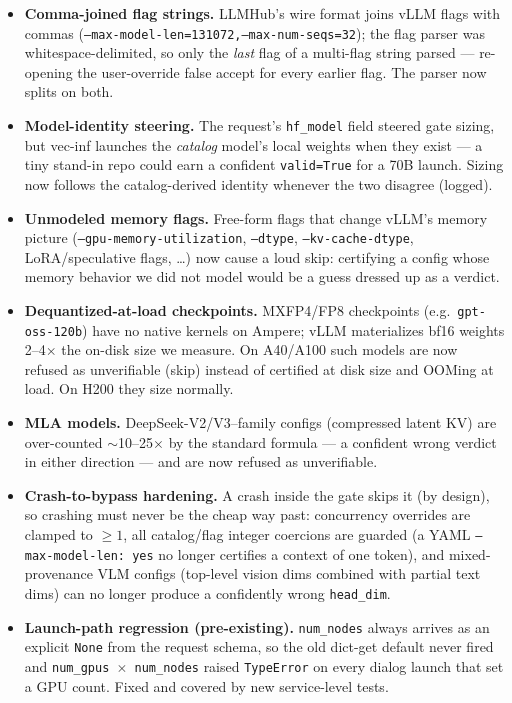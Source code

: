 \documentclass[11pt]{article}
\newcommand{\code}[1]{\texttt{#1}}
\begin{document}
\begin{itemize}[leftmargin=1.4em]
\item \textbf{Comma-joined flag strings.} LLMHub's wire format joins vLLM
  flags with commas (\code{--max-model-len=131072,--max-num-seqs=32}); the
  flag parser was whitespace-delimited, so only the \emph{last} flag of a
  multi-flag string parsed --- re-opening the user-override false accept for
  every earlier flag. The parser now splits on both.
\item \textbf{Model-identity steering.} The request's \code{hf\_model} field
  steered gate sizing, but vec-inf launches the \emph{catalog} model's local
  weights when they exist --- a tiny stand-in repo could earn a confident
  \code{valid=True} for a 70B launch. Sizing now follows the catalog-derived
  identity whenever the two disagree (logged).
\item \textbf{Unmodeled memory flags.} Free-form flags that change vLLM's
  memory picture (\code{--gpu-memory-utilization}, \code{--dtype},
  \code{--kv-cache-dtype}, LoRA/speculative flags, \dots) now cause a loud
  skip: certifying a config whose memory behavior we did not model would be a
  guess dressed up as a verdict.
\item \textbf{Dequantized-at-load checkpoints.} MXFP4/FP8 checkpoints (e.g.\
  \code{gpt-oss-120b}) have no native kernels on Ampere; vLLM materializes
  bf16 weights 2--4$\times$ the on-disk size we measure. On A40/A100 such
  models are now refused as unverifiable (skip) instead of certified at disk
  size and OOMing at load. On H200 they size normally.
\item \textbf{MLA models.} DeepSeek-V2/V3--family configs (compressed latent
  KV) are over-counted $\sim$10--25$\times$ by the standard formula --- a
  confident wrong verdict in either direction --- and are now refused as
  unverifiable.
\item \textbf{Crash-to-bypass hardening.} A crash inside the gate skips it
  (by design), so crashing must never be the cheap way past: concurrency
  overrides are clamped to $\ge 1$, all catalog/flag integer coercions are
  guarded (a YAML \code{--max-model-len: yes} no longer certifies a context
  of one token), and mixed-provenance VLM configs (top-level vision dims
  combined with partial text dims) can no longer produce a confidently wrong
  \code{head\_dim}.
\item \textbf{Launch-path regression (pre-existing).} \code{num\_nodes} always
  arrives as an explicit \code{None} from the request schema, so the old
  dict-get default never fired and \code{num\_gpus $\times$ num\_nodes} raised
  \code{TypeError} on every dialog launch that set a GPU count. Fixed and
  covered by new service-level tests.
\end{itemize}
\end{document}
